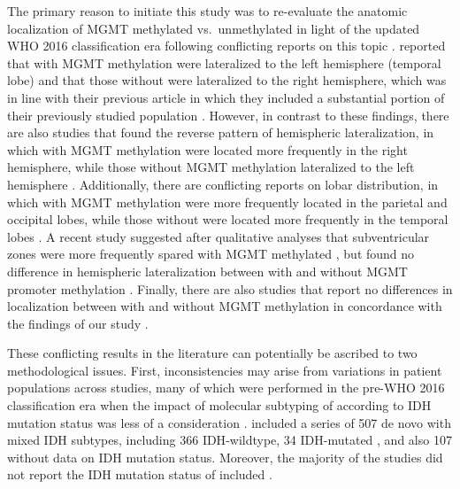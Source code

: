 The primary reason to initiate this study was to re-evaluate the anatomic localization of \gls{MGMT} methylated vs.\ unmethylated  in light of the updated \gls{WHO} 2016 classification era following conflicting reports on this topic \autocite{smits2017imaging}.
 reported that  with \gls{MGMT} methylation were lateralized to the left hemisphere (temporal lobe) and that those without were lateralized to the right hemisphere, which was in line with their previous article in which they included a substantial portion of their previously studied  population \autocite{ellingson2012anatomic}.
However, in contrast to these findings, there are also studies that found the reverse pattern of hemispheric lateralization, in which  with \gls{MGMT} methylation were located more frequently in the right hemisphere, while those without \gls{MGMT} methylation lateralized to the left hemisphere \autocite{wang2014anatomical}.
Additionally, there are conflicting reports on lobar distribution, in which  with \gls{MGMT} methylation were more frequently located in the parietal and occipital lobes, while those without were located more frequently in the temporal lobes \autocite{eoli2007methylation}.
A recent study suggested after qualitative analyses that subventricular zones were more frequently spared with \gls{MGMT} methylated , but found no difference in hemispheric lateralization between  with and without \gls{MGMT} promoter methylation \autocite{han2018structural}.
Finally, there are also studies that report no differences in localization between  with and without \gls{MGMT} methylation in concordance with the findings of our study \autocite{carillo2012relationship, drabycz2010analysis}.

These conflicting results in the literature can potentially be ascribed to two methodological issues.
First, inconsistencies may arise from variations in  patient populations across studies, many of which were performed in the pre-\gls{WHO} 2016 classification era when the impact of molecular subtyping of  according to \gls{IDH} mutation status was less of a consideration \autocite{louis20162016}.
 included a series of 507 de novo  with mixed \gls{IDH} subtypes, including 366 \gls{IDH}-wildtype, 34 \gls{IDH}-mutated , and also 107  without data on \gls{IDH} mutation status.
Moreover, the majority of the studies did not report the \gls{IDH} mutation status of included  \autocite{ellingson2012anatomic,wang2014anatomical,eoli2007methylation,drabycz2010analysis}.

